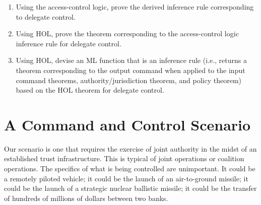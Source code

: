 \begin{exercise}[\synthesis]
  \begin{enumerate}[{A.}]
  \item Using the access-control logic, prove the derived inference
    rule corresponding to delegate control.
  \item Using HOL, prove the theorem corresponding to the
    access-control logic inference rule for delegate control.
  \item Using HOL, devise an ML function that is an inference rule
    (i.e., returns a theorem corresponding to the output command when
    applied to the input command theorems, authority/jurisdiction
    theorem, and policy theorem) based on the HOL theorem for delegate
    control.
  \end{enumerate}
\end{exercise}



\section{A Command and Control Scenario}
\label{sec:c2-scenario}


Our scenario is one that requires the exercise of joint authority in
the midst of an established trust infrastructure.  This is typical of
joint operations or coalition operations.  The specifics of what is
being controlled are unimportant. It could be a remotely piloted
vehicle; it could be the launch of an air-to-ground missile; it could
be the launch of a strategic nuclear ballistic missile; it could be
the transfer of hundreds of millions of dollars between two banks.

